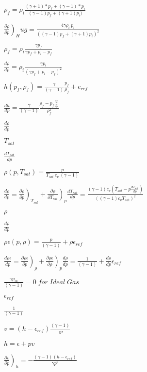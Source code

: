\documentclass{article}
\begin{document}
$ \rho_f =\rho_i\frac{ (\gamma + 1)*p_f + (\gamma - 1)*p_i}{(\gamma - 1)p_f +(\gamma + 1)p_i) }$
\pagebreak

$ \left. \frac{\partial \rho}{\partial p} \right)_Hug = \frac{4\gamma \rho_i \ p_i}{ \left( (\gamma - 1)p_f +(\gamma + 1)p_i \right) ^2} $
\pagebreak

$ \rho_f = \rho_i \frac{\gamma p_f}{\gamma p_f + p_i - p_f} $
\pagebreak

$ \frac{d\rho}{dp} = \rho_i \frac{\gamma p_i}{\left(\gamma p_f + p_i - p_f\right)^2} $
\pagebreak

$ h(p_f,{\rho_f})= \frac{\gamma}{(\gamma-1)}\frac{p_f}{\rho_f} +e_{ref} $
\pagebreak

$ \frac{dh}{dp}=\frac{\gamma}{(\gamma-1)}\frac{ \rho_f - p_f \frac{d\rho}{dp} }{\rho_f^2} $
\pagebreak

$\frac{d\rho}{dp}$
\pagebreak

$T_{sat}$
\pagebreak

$\frac{d T_{sat}}{d p}$
\pagebreak

$ \rho(p, T_{sat}) = \frac{p}{T_{sat} \ c_v \ (\gamma-1)}\ $
\pagebreak

$\frac{d \rho}{d p} = \left. \frac{\partial \rho}{\partial p} \right)_{T_{sat}} + \left. \frac{\partial \rho}{\partial T_{sat} } \right)_p \frac{d T_{sat}}{d p} =\frac{(\gamma-1)c_v\left(T_{sat} - p\frac{d T_{sat}}{d p}\right) }{\left((\gamma-1)c_vT_{sat}\right)^2 }$
\pagebreak

$ \rho $
\pagebreak

$\frac{d \rho}{d p}$
\pagebreak

$ \rho\epsilon(p, \rho) = \frac{p}{(\gamma-1)} +\rho\epsilon_{ref}$
\pagebreak

$ \frac{d \rho\epsilon}{d p} =\left. \frac{\partial \rho\epsilon}{\partial p} \right)_{\rho} + \left. \frac{\partial \rho\epsilon}{\partial\rho } \right)_p \frac{d \rho}{d p} = \frac{1}{(\gamma-1)} +\frac{d \rho}{d p}\epsilon_{ref} $
\pagebreak

$ \frac{\gamma p_{\infty}}{(\gamma-1)} = 0 \;for\; Ideal\; Gas$
\pagebreak

$ \epsilon_{ref} $
\pagebreak

$ \frac{1}{(\gamma-1)}$
\pagebreak

$ v= (h - \epsilon_{ref})\frac{(\gamma-1)}{\gamma p} $
\pagebreak

$ h=\epsilon +pv $
\pagebreak

$ \left. \frac{\partial v}{\partial p} \right)_h = - \frac{(\gamma-1)(h-\epsilon_{ref})}{\gamma p^2} $
\pagebreak
\end{document}
